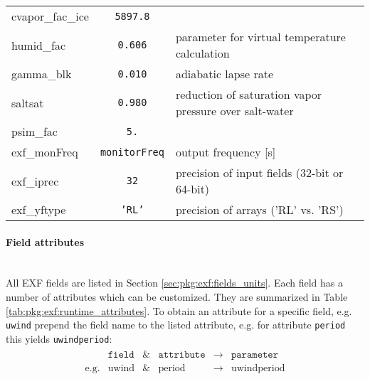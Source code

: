 \begin{table}[!ht]
{\begin{tabular}{|l|c|l|}
        cvapor\_fac\_ice & \texttt{5897.8} & 
          ~ \\
        humid\_fac & \texttt{0.606} & 
          parameter for virtual temperature calculation \\
        gamma\_blk & \texttt{0.010} & 
          adiabatic lapse rate \\
        saltsat & \texttt{0.980} & 
          reduction of saturation vapor pressure over salt-water \\          
        psim\_fac & \texttt{5.} & 
          ~ \\          
        exf\_monFreq & \texttt{monitorFreq} & 
          output frequency [s] \\
        exf\_iprec  & \texttt{32} & 
          precision of input fields (32-bit or 64-bit) \\
        exf\_yftype & \texttt{'RL'} & 
          precision of arrays ('RL' vs. 'RS') \\
      \hline
    \end{tabular}
  }
  \caption{~}
  \label{tab:pkg:exf:runtime_flags}
\end{table}


\paragraph{Field attributes} 
~ \\
%
All EXF fields are listed in Section \ref{sec:pkg:exf:fields_units}.
Each field has a number of attributes which can be customized.
They are summarized in
Table \ref{tab:pkg:exf:runtime_attributes}.
To obtain an attribute for a specific field, e.g. \texttt{uwind}
prepend the field name to the listed attribute, e.g. for attribute
\texttt{period} this yields \texttt{uwindperiod}:
%
\begin{eqnarray*}
  \begin{array}{cccccc}
    ~ & \texttt{field} & \& & \texttt{attribute} & \longrightarrow & \texttt{parameter} \\
    \text{e.g.} & \text{uwind} & \& & \text{period} & \longrightarrow & \text{uwindperiod} \\
  \end{array}
\end{eqnarray*}
%

